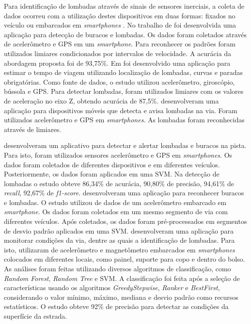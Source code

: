 Para identificação de lombadas através de sinais de sensores inerciais, a coleta de dados ocorreu com a utilização destes dispositivos em duas formas: fixados no veículo \cite{Sabir2019,Padilla2018} ou embarcados em \textit{smartphones} \cite{Fouad2014,Alam2020,Rishiwal2016,Wang2018,Verma2016,Souza2018,Edwan2019,Savera2016,Idris2019,Dey2019,Aljaafreh2017,Aragon2016}. No trabalho de \cite{Rishiwal2016} foi desenvolvida uma aplicação para detecção de buracos e lombadas. Os dados foram coletados através de acelerômetro e GPS em um \textit{smartphone}. Para reconhecer os padrões foram utilizados limiares condicionados por intervalos de velocidade. A acurácia da abordagem proposta foi de 93,75\%. Em \cite{Verma2016} foi desenvolvido uma aplicação para estimar o tempo de viagem utilizando localização de lombadas, curvas e paradas obrigatórias. Como fonte de dados, o estudo utilizou acelerômetro, giroscópio, bússola e GPS. Para detectar lombadas, foram utilizados limiares com os valores de aceleração no eixo Z, obtendo acurácia de 87,5\%. \cite{Edwan2019} desenvolveram uma aplicação para dispositivos móveis que detecta e avisa lombadas na via. Foram utilizados acelerômetro e GPS em \textit{smartphones}. As lombadas foram reconhecidas através de limiares.

\cite{Savera2016} desenvolveram um aplicativo para detectar e alertar lombadas e buracos na pista. Para isto, foram utilizados sensores acelerômetro e GPS em \textit{smartphones}. Os dados foram coletados de diferentes dispositivos e em diferentes veículos. Posteriormente, os dados foram aplicados em uma SVM. Na detecção de lombadas o estudo obteve 86,34\% de acurácia, 90,80\% de precisão, 94,61\% de \textit{recall}, 92,67\% de \textit{f1-score}. \cite{Idris2019} desenvolveram uma aplicação para reconhecer buracos e lombadas. O estudo utilizou de dados de um acelerômetro embarcado em \textit{smartphone}. Os dados foram coletados em um mesmo segmento de via com diferentes veículos. Após coletados, os dados foram pré-processados em segmentos de desvio padrão aplicados em uma SVM. \cite{Dey2019} desenvolveram uma aplicação para monitorar condições da via, dentre as quais a identificação de lombadas. Para isto, utilizaram de acelerômetro e magnetômetro embarcados em \textit{smartphones} colocados em diferentes locais, como painel, suporte para copo e dentro do bolso. As análises foram feitas utilizando diversos algoritmos de classificação, como \textit{Random Forest}, \textit{Random Tree} e SVM. A classificação foi feita após a seleção de características usando os algoritmos \textit{GreedyStepwise}, \textit{Ranker} e \textit{BestFirst}, considerando o valor mínimo, máximo, mediana e desvio padrão como recursos estatísticos. O estudo obteve 92\% de precisão para detectar as condições da superfície da estrada.

